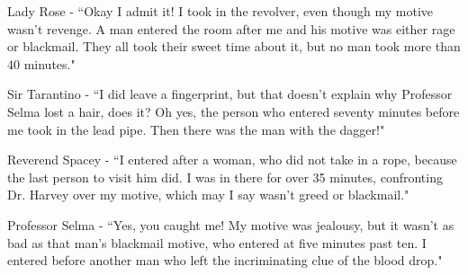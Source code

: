 \documentclass[addpoints]{exam}
\begin{document}
\begin{questions}
Lady Rose - ``Okay I admit it! I took in the revolver, even though my motive wasn't revenge. A man entered the room after me and his motive was either rage or blackmail. They all took their sweet time about it, but no man took more than 40 minutes."

Sir Tarantino - ``I did leave a fingerprint, but that doesn't explain why Professor Selma lost a hair, does it? Oh yes, the person who entered seventy minutes before me took in the lead pipe. Then there was the man with the dagger!"

Reverend Spacey - ``I entered after a woman, who did not take in a rope, because the last person to visit him did. I was in there for over 35 minutes, confronting Dr. Harvey over my motive, which may I say wasn't greed or blackmail."

Professor Selma - ``Yes, you caught me! My motive was jealousy, but it wasn't as bad as that man's blackmail motive, who entered at five minutes past ten. I entered before another man who left the incriminating clue of the blood drop."

\end{questions}
\end{document}
